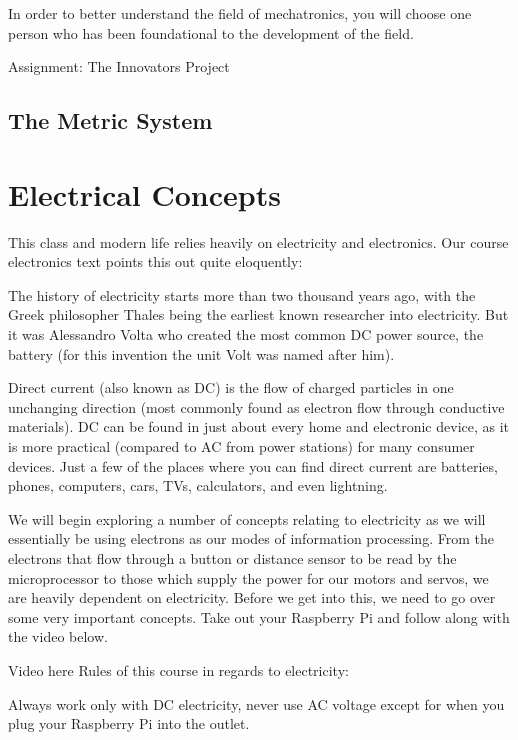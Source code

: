 \documentclass[
]{book}
\begin{document}
In order to better understand the field of mechatronics, you will choose one person who has been foundational to the development of the field.

Assignment: The Innovators Project

\hypertarget{the-metric-system}{%
\section{The Metric System}\label{the-metric-system}}

\hypertarget{electrical-concepts}{%
\chapter{Electrical Concepts}\label{electrical-concepts}}

This class and modern life relies heavily on electricity and electronics. Our course electronics text points this out quite eloquently:

The history of electricity starts more than two thousand years ago, with the Greek philosopher Thales being the earliest known researcher into electricity. But it was Alessandro Volta who created the most common DC power source, the battery (for this invention the unit Volt was named after him).

Direct current (also known as DC) is the flow of charged particles in one unchanging direction (most commonly found as electron flow through conductive materials). DC can be found in just about every home and electronic device, as it is more practical (compared to AC from power stations) for many consumer devices. Just a few of the places where you can find direct current are batteries, phones, computers, cars, TVs, calculators, and even lightning.

We will begin exploring a number of concepts relating to electricity as we will essentially be using electrons as our modes of information processing. From the electrons that flow through a button or distance sensor to be read by the microprocessor to those which supply the power for our motors and servos, we are heavily dependent on electricity. Before we get into this, we need to go over some very important concepts. Take out your Raspberry Pi and follow along with the video below.

Video here
Rules of this course in regards to electricity:

Always work only with DC electricity, never use AC voltage except for when you plug your Raspberry Pi into the outlet.
\end{document}
